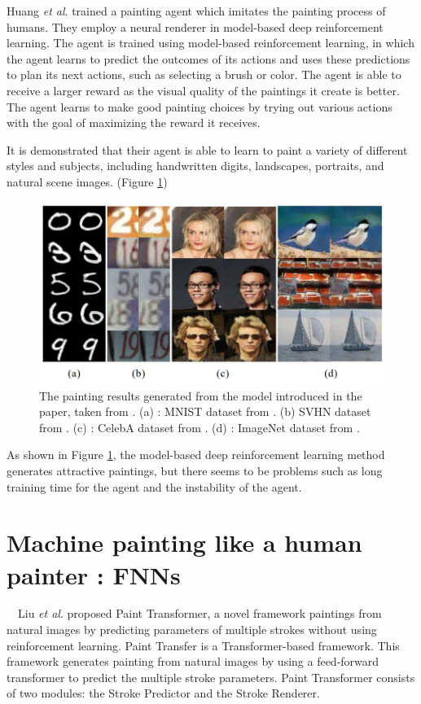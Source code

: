 Huang \textit{et al}. \cite{Huang_2019_ICCV} trained a painting agent which 
imitates the painting process of humans. 
They employ a neural renderer in model-based deep reinforcement learning.
The agent is trained using model-based reinforcement learning, in which the 
agent learns to predict the outcomes of its actions and uses these predictions 
to plan its next actions, such as selecting a brush or color.
The agent is able to receive a larger reward as the visual quality of the 
paintings it create is better. The agent learns to make good painting choices by 
trying out various actions with the goal of maximizing the reward it receives.

It is demonstrated that their agent is able to learn to paint a variety of 
different styles and subjects, including handwritten digits, landscapes, 
portraits, and natural scene images. (Figure \ref{LearnToPaint})
\begin{figure}[h]
    \centering
    \includegraphics[width=120truemm]{resources/3_related_work/LearnToPaint.png}
    \caption{
        The painting results generated from the model introduced in the paper,
        taken from \cite{Huang_2019_ICCV}.
        (a) : MNIST dataset from \cite{deng2012mnist}. (b) SVHN dataset from \cite{netzer2011reading}.
        (c) : CelebA dataset from \cite{Liu_2015_ICCV}. 
        (d) : ImageNet dataset from \cite{russakovsky2015imagenet}.
    }
    \label{LearnToPaint}
\end{figure}
\newline
As shown in Figure \ref{LearnToPaint}, the model-based deep reinforcement 
learning method generates attractive paintings, but there seems to be problems
such as long training time for the agent and the instability of the agent.

\section{Machine painting like a human painter : FNNs}
　Liu \textit{et al}. \cite{liu2021paint} proposed Paint Transformer, a novel 
framework paintings from natural images by predicting parameters of multiple 
strokes without using reinforcement learning. 
Paint Transfer is a Transformer-based framework. This framework generates 
painting from natural images by using a feed-forward transformer to predict 
the multiple stroke parameters. 
Paint Transformer consists of two modules: the Stroke Predictor and the Stroke Renderer.  

